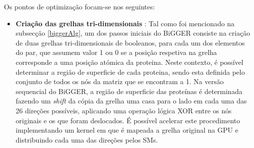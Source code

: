 Os pontos de optimização focam-se nos seguintes:
\begin{itemize}
\item{\textbf{Criação das grelhas tri-dimensionais}} : 
Tal como foi mencionado na subsecção \ref{biggerAlg}, um dos passos iniciais do BiGGER consiste na criação de duas grelhas tri-dimensionais de booleanos, para cada um dos elementos do par, que assumem valor 1 ou 0 se a posição respetiva na grelha corresponde a uma posição atómica da proteina. Neste contexto, é possível determinar a região de superficie de cada proteina, sendo esta definida pelo conjunto de todos os nós da matriz que se encontram a 1. Na versão sequencial do BiGGER, a região de superficie das proteínas é determinada fazendo um \textit{shift} da cópia da grelha uma casa para o lado em cada uma das 26 direções possíveis, aplicando uma operação lógica XOR entre os nós originais e os que foram deslocados. É possível acelerar este procedimento implementando um kernel em que é mapeada a grelha original na GPU e distribuindo cada uma das direções pelos SMs.

%
%


\end{itemize}
